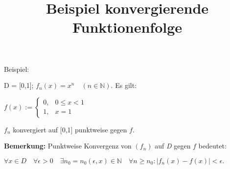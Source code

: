 \documentclass{article}
\title{Beispiel konvergierende Funktionenfolge}
\begin{document}
\maketitle

Beispiel:
\vspace{5mm}

D = [0,1];   \begin{math}
f_n(x) = x^n \quad (n \in \mathbb{N}).\end{math} Es gilt: \vspace{5mm}

\begin{math} f(x) := 
\begin{cases} 
0, & 0 \leq x < 1\\
1, & x = 1
\end{cases} \end{math}
\vspace{5mm}

$f_n$ konvergiert auf [0,1] punktweise gegen $f$.

\vspace{10mm}
\textbf{Bemerkung:} Punktweise Konvergenz von $(f_n)$ auf \textit{D} gegen $f$ bedeutet:

\vspace{5mm}
\begin{math}
\forall x \in D \quad \forall \epsilon > 0 \quad \exists n_0 = n_0(\epsilon, x) \in \mathbb{N} \quad \forall n \geq n_0: |f_n(x) - f(x)| < \epsilon.
\end{math}
\end{document}
